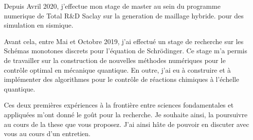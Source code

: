 \documentclass[11pt,a4paper,sans]{moderncv}        %
\begin{document}
Depuis Avril 2020, j'effectue mon stage de master au sein du programme numerique de Total R\&D Saclay sur la generation de maillage hybride. pour des simulation en sismique.
 
Avant cela, entre Mai et Octobre 2019, j’ai effectué un stage de recherche sur les Schémas monotones discrets pour l'équation de Schrödinger. Ce stage m'a permis de travailler sur la construction de nouvelles méthodes numériques pour le contrôle optimal en mécanique quantique. En outre, j’ai eu à construire et à implémenter des algorithmes pour le contrôle de réactions chimiques à l'échelle quantique.



Ces deux premières expériences à la frontière entre sciences fondamentales et appliquées m’ont donné le goût pour la recherche. Je souhaite ainsi, la poursuivre au cours de la these que vous proposez. J’ai ainsi hâte de pouvoir en discuter avec vous au cours d'un entretien.




\makeletterclosing
\end{document}
